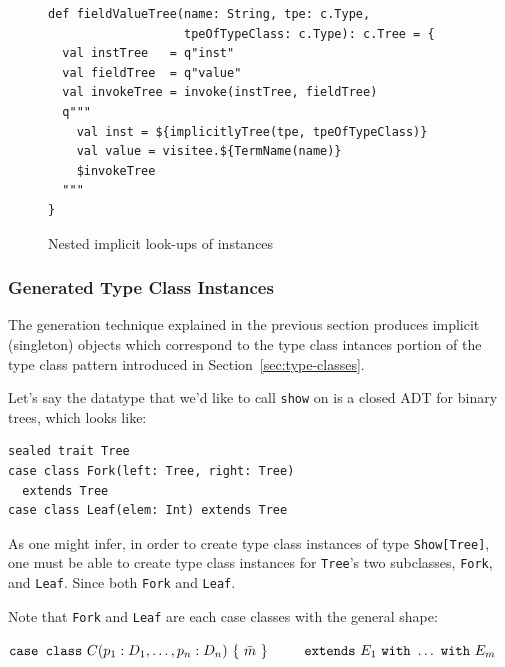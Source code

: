 \documentclass[preprint]{sigplanconf}
\begin{document}
\begin{figure}
\centering
\begin{lstlisting}
def fieldValueTree(name: String, tpe: c.Type,
                   tpeOfTypeClass: c.Type): c.Tree = {
  val instTree   = q"inst"
  val fieldTree  = q"value"
  val invokeTree = invoke(instTree, fieldTree)
  q"""
    val inst = ${implicitlyTree(tpe, tpeOfTypeClass)}
    val value = visitee.${TermName(name)}
    $invokeTree
  """
}
\end{lstlisting}
  \caption{Nested implicit look-ups of instances}
  \label{fig:macro-field-value}
\end{figure}




\subsubsection{Generated Type Class Instances}
\label{sec:generated-type-class-instances}

The generation technique explained in the previous section produces implicit
(singleton) objects which correspond to the type class intances portion of the
type class pattern introduced in Section~\ref{sec:type-classes}.

Let's say the datatype that we'd like to call \verb|show| on is a closed
ADT for binary trees, which looks like:

\begin{lstlisting}
sealed trait Tree
case class Fork(left: Tree, right: Tree)
  extends Tree
case class Leaf(elem: Int) extends Tree
\end{lstlisting}
\noindent

As one might infer, in order to create type class instances of type
\verb|Show[Tree]|, one must be able to create type class instances for
\verb|Tree|'s two subclasses, \verb|Fork|, and \verb|Leaf|. Since both
\verb|Fork| and \verb|Leaf|.

Note that \verb|Fork| and \verb|Leaf| are each case classes with the general
shape:

\begin{math}
\texttt{case class}~C(p_1: D_1, \ldots, p_n: D_n)~\{~\bar{m}~\} \\
\texttt{~~~~~extends}~E_1~\texttt{with}~ \ldots ~\texttt{with}~E_m
\end{math}
\noindent
\end{document}
